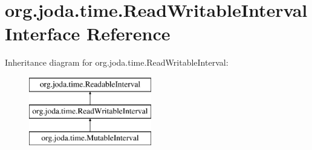 \hypertarget{interfaceorg_1_1joda_1_1time_1_1_read_writable_interval}{\section{org.\-joda.\-time.\-Read\-Writable\-Interval Interface Reference}
\label{interfaceorg_1_1joda_1_1time_1_1_read_writable_interval}
}
Inheritance diagram for org.\-joda.\-time.\-Read\-Writable\-Interval\-:\begin{figure}[H]
\begin{center}
\leavevmode
\includegraphics[height=3.000000cm]{interfaceorg_1_1joda_1_1time_1_1_read_writable_interval}
\end{center}
\end{figure}
